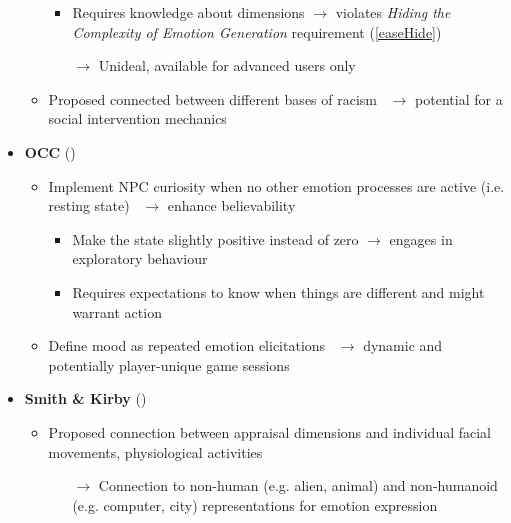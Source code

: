 \begin{itemize}
\begin{itemize}
\begin{itemize}
            \item Requires knowledge about dimensions $\rightarrow$ violates
            \textit{Hiding the Complexity of Emotion Generation} requirement
            (\ref{easeHide})

            \item [$\rightarrow$] Unideal, available for advanced users only
        \end{itemize}

        \item Proposed connected between different bases of
        racism~\citep[p.~84--85]{roseman2001model} $\rightarrow$ potential for
        a social intervention mechanics
    \end{itemize}

    \item \textbf{OCC} (\good)
    \begin{itemize}
        \item Implement NPC curiosity when no other emotion processes are
        active (i.e. resting state)~\citep[p.~194]{ortony2005affect}
        $\rightarrow$ enhance believability
        \begin{itemize}
            \item Make the state slightly positive instead of zero $\rightarrow$
            engages in exploratory behaviour

            \item Requires expectations to know when things are different and
            might warrant action
        \end{itemize}

        \item Define mood as repeated emotion elicitations~\citep[p.~189]{occ}
        $\rightarrow$ dynamic and potentially player-unique game sessions
    \end{itemize}

    \item \textbf{Smith \& Kirby} (\good)
    \begin{itemize}
        \item Proposed connection between appraisal dimensions and individual
        facial movements, physiological activities~\citep[p.~237--240,
        242--243]{smith_scott_mandler_1997}
        \begin{itemize}
            \item [$\rightarrow$] Connection to non-human (e.g. alien, animal)
            and non-humanoid (e.g. computer, city) representations for emotion
            expression
        \end{itemize}
    \end{itemize}


\end{itemize}
